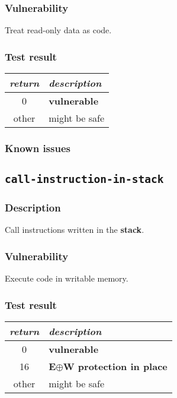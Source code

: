 \documentclass[a4paper]{book}
\begin{document}
\subsubsection{Vulnerability}
Treat read-only data as code.

\subsubsection{Test result}
\begin{tabular}{cl}
  \toprule
  \emph{return}  & \emph{description} \\
  \midrule
  0              & \textbf{vulnerable} \\
  other          & might be safe \\
  \bottomrule
\end{tabular}

\subsubsection{Known issues}

\newpage

\subsection{\texttt{call-instruction-in-stack}}\label{test-call-instruction-in-stack}

\subsubsection{Description}
Call instructions written in the \textbf{stack}.

\subsubsection{Vulnerability}
Execute code in writable memory.

\subsubsection{Test result}
\begin{tabular}{cl}
  \toprule
  \emph{return}  & \emph{description} \\
  \midrule
  0              & \textbf{vulnerable} \\
  16             & \textbf{E$\oplus$W protection in place} \\
  other          & might be safe \\
  \bottomrule
\end{tabular}
  
\end{document}
